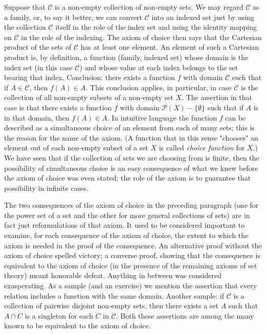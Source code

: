 Suppose that $\mathcal{C}$ is a non-empty collection of non-empty sets. We may regard $\mathcal{C}$ as a family, or, to say it better, we can convert $\mathcal{C}$ into an indexed set just by using the collection $\mathcal{C}$ itself in the role of the index set and using the identity mapping on $\mathcal{C}$ in the role of the indexing. The axiom of choice then says that the Cartesian product of the sets of $\mathcal{C}$ has at least one element. An element of such a Cartesian product is, by definition, a function (family, indexed set) whose domain is the index set (in this case $\mathcal{C}$) and whose value at each index belongs to the set bearing that index. Conclusion: there exists a function $f$ with domain $\mathcal{C}$ such that if $A \in \mathcal{C}$, then $f(A) \in A$. This conclusion applies, in particular, in case $\mathcal{C}$ is the collection of all non-empty subsets of a non-empty set $X$. The assertion in that case is that there exists a function $f$ with domain $\mathcal{P}(X) - \{ \emptyset \}$ such that if $A$ is in that domain, then $f(A) \in A$. In intuitive language the function $f$ can be described as a simultaneous choice of an element from each of many sets; this is the reason for the name of the axiom. (A function that in this sense "chooses" an element out of each non-empty subset of a set $X$ is called \textit{choice function} for $X$.) We have seen that if the collection of sets we are choosing from is finite, then the possibility of simultaneous choice is an easy consequence of what we knew before the axiom of choice was even stated; the role of the axiom is to guarantee that possibility in infinite cases. 

The two consequences of the axiom of choice in the preceding paragraph (one for the power set of a set and the other for more general collections of sets) are in fact just reformulations of that axiom. It used to be considered important to examine, for each consequence of the axiom of choice, the extent to which the axiom is needed in the proof of the consequence. An alternative proof without the axiom of choice spelled victory; a converse proof, showing that the consequence is equivalent to the axiom of choice (in the presence of the remaining axioms of set theory) meant honorable defeat. Anything in between was considered exasperating. As a sample (and an exercise) we mention the assertion that every relation includes a function with the same domain. Another sample: if $\mathcal{C}$ is a collection of pairwise disjoint non-empty sets, then there exists a set $A$ such that $A \cap C$ is a singleton for each $C$ in $\mathcal{C}$. Both these assertions are among the many known to be equivalent to the axiom of choice. 

